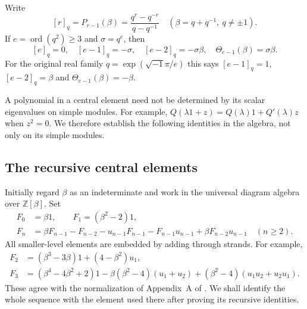\documentclass[a4paper,11pt,oneside,reqno]{amsart}
\theoremstyle{definition}
\numberwithin{equation}{section}
\begin{document}
	Write
	\[
	[r]_q=P_{r-1}(\beta)=\frac{q^r-q^{-r}}{q-q^{-1}}
	\quad(\beta=q+q^{-1},\ q\ne\pm1).
	\]
	If $e=\operatorname{ord}(q^2)\ge3$ and $\sigma=q^e$, then
	\begin{equation}\label{tl:root-values}
		[e]_q=0,\quad [e-1]_q=-\sigma,\quad
		[e-2]_q=-\sigma\beta,\quad
		\Theta_{e-1}(\beta)=\sigma\beta.
	\end{equation}
	For the original real family $q=\exp(\sqrt{-1}\pi/e)$ this says
	$[e-1]_q=1$, $[e-2]_q=\beta$ and
	$\Theta_{e-1}(\beta)=-\beta$.
	
	A polynomial in a central element need not be determined by its
	scalar eigenvalues on simple modules.  For example,
	$Q(\lambda1+z)=Q(\lambda)1+Q'(\lambda)z$ when $z^2=0$.
	We therefore establish the following identities in the algebra,
	not only on its simple modules.
	
	\subsection{The recursive central elements}
	Initially regard $\beta$ as an indeterminate and work in the
	universal diagram algebra over $\mathbb Z[\beta]$.  Set
	\begin{equation}\label{tl:Frec}
		\begin{aligned}
			F_0&=\beta1,\qquad F_1=(\beta^2-2)1,\\
			F_n&=\beta F_{n-1}-F_{n-2}-u_{n-1}F_{n-1}-F_{n-1}u_{n-1}
			+\beta F_{n-2}u_{n-1}\quad(n\ge2).
		\end{aligned}
	\end{equation}
	All smaller-level elements are embedded by adding through strands.
	For example,
	\begin{align}
		F_2&=(\beta^3-3\beta)1+(4-\beta^2)u_1,\label{tl:F2}\\
		F_3&=(\beta^4-4\beta^2+2)1
		-\beta(\beta^2-4)(u_1+u_2)
		+(\beta^2-4)(u_1u_2+u_2u_1).\label{tl:F3}
	\end{align}
	These agree with the normalization of Appendix~A of \cite{RSA}.
	We shall identify the whole sequence with the element used there
	after proving its recursive identities.
	
\end{document}
